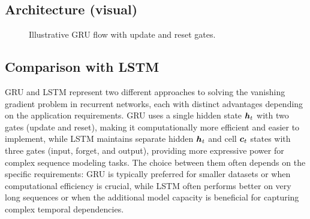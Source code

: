 \subsection{Architecture (visual)}
\begin{figure}[h]
    \centering
    \caption{Illustrative GRU flow with update and reset gates.}
\end{figure}

\subsection{Comparison with LSTM}

GRU and LSTM represent two different approaches to solving the vanishing gradient problem in recurrent networks, each with distinct advantages depending on the application requirements. GRU uses a single hidden state $\boldsymbol{h}_t$ with two gates (update and reset), making it computationally more efficient and easier to implement, while LSTM maintains separate hidden $\boldsymbol{h}_t$ and cell $\boldsymbol{c}_t$ states with three gates (input, forget, and output), providing more expressive power for complex sequence modeling tasks. The choice between them often depends on the specific requirements: GRU is typically preferred for smaller datasets or when computational efficiency is crucial, while LSTM often performs better on very long sequences or when the additional model capacity is beneficial for capturing complex temporal dependencies.

